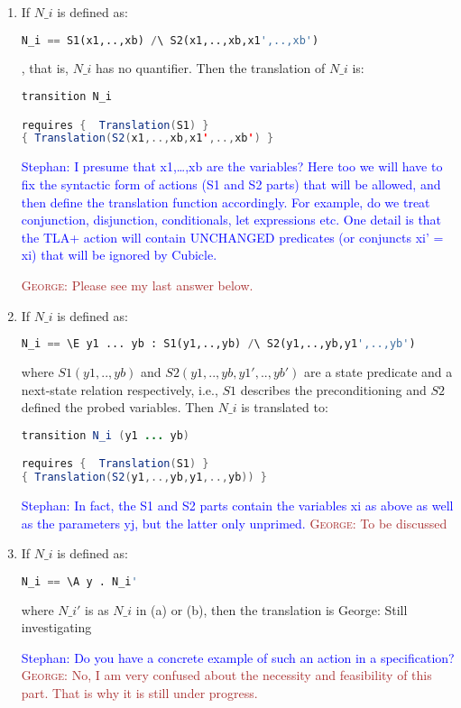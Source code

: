 \documentclass{article}
\theoremstyle{plain}
\numberwithin{equation}{section}
\newcommand{\george}[1]{\textcolor{brown}{\textsc{George: } {\sf #1}}}
\newcommand{\ste}[1]{\par\noindent\textcolor{blue}{\small Stephan: #1}}
\newcommand {\A}{\mathbb A}
\begin{document}
\begin{enumerate}

\item If  $N\_i$ is defined as:

\begin{lstlisting}[language=Python]
N_i == S1(x1,..,xb) /\ S2(x1,..,xb,x1',..,xb')
\end{lstlisting}
, that is, $N\_i$ has no quantifier. Then the translation of  $N\_i$ is: 


\begin{lstlisting}[language=Java]
transition N_i 

requires {  Translation(S1) }
{ Translation(S2(x1,..,xb,x1',..,xb') }

\end{lstlisting}







\ste{I presume that x1,\dots,xb are the variables? Here too we will have to fix
  the syntactic form of actions (S1 and S2 parts) that will be allowed, and then
  define the translation function accordingly. For example, do we treat
  conjunction, disjunction, conditionals, let expressions etc.
  One detail is that the TLA+ action will contain UNCHANGED predicates (or
  conjuncts xi' = xi) that will be ignored by Cubicle.}

  \george{Please see my last answer below.  }

\item If  $N\_i$ is defined as:

\begin{lstlisting}[language=Python]
N_i == \E y1 ... yb : S1(y1,..,yb) /\ S2(y1,..,yb,y1',..,yb')
\end{lstlisting}

where $S1(y1,..,yb)$  and $S2(y1,..,yb,y1',..,yb')$  are a state predicate and a next-state relation respectively, i.e., $S1$ describes the preconditioning and $S2$ defined the probed variables. Then  $N\_i$ is translated to: 

\begin{lstlisting}[language=Java]
transition N_i (y1 ... yb) 

requires {  Translation(S1) }
{ Translation(S2(y1,..,yb,y1,..,yb)) }

\end{lstlisting}

\ste{In fact, the S1 and S2 parts contain the variables xi as above as well as
  the parameters yj, but the latter only unprimed.}
  \george{To be discussed}

\item If  $N\_i$ is defined as:
\begin{lstlisting}[language=Python]
N_i == \A y . N_i' 
\end{lstlisting}
where $N\_i' $ is as $N\_i$  in (a) or (b), then the translation is 
\color{red} George: Still investigating \color{black}

\ste{Do you have a concrete example of such an action in a specification?}
\george{No,  I am very confused about the necessity and feasibility of this part. That is why it is still under progress. }
\end{enumerate}
\end{document}
